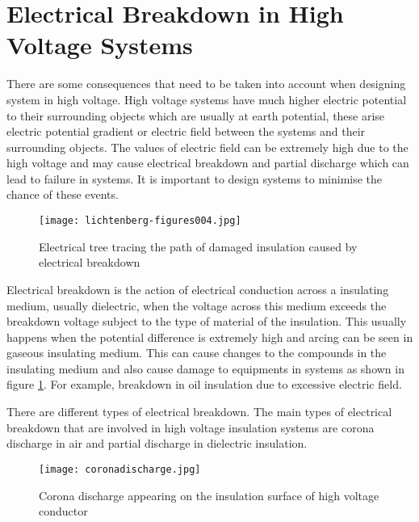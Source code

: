 \section{Electrical Breakdown in High Voltage Systems} %
There are some consequences that need to be taken into account when designing system in high voltage. High voltage systems have much higher electric potential to their surrounding objects which are usually at earth potential, these arise electric potential gradient or electric field between the systems and their surrounding objects. The values of electric field can be extremely high due to the high voltage and may cause electrical breakdown and partial discharge which can lead to failure in systems. It is important to design systems to minimise the chance of these events.
\begin{figure}[!h]
   \centering
   \texttt{[image: lichtenberg-figures004.jpg]}
   \caption{Electrical tree tracing the path of damaged insulation caused by electrical breakdown}
   \label{figure:breakdown}
\end{figure}
Electrical breakdown is the action of electrical conduction across a insulating medium, usually dielectric, when the voltage across this medium exceeds the breakdown voltage subject to the type of material of the insulation. This usually happens when the potential difference is extremely high and arcing can be seen in gaseous insulating medium. This can cause changes to the compounds in the insulating medium and also cause damage to equipments in systems as shown in figure \ref{figure:breakdown}. For example, breakdown in oil insulation due to excessive electric field.

There are different types of electrical breakdown. The main types of electrical breakdown that are involved in high voltage insulation systems are corona discharge in air and partial discharge in dielectric insulation.

\begin{figure}[!h]
   \centering
   \texttt{[image: coronadischarge.jpg]}
   \caption{Corona discharge appearing on the insulation surface of high voltage conductor}
   \label{figure:corona}
\end{figure}

